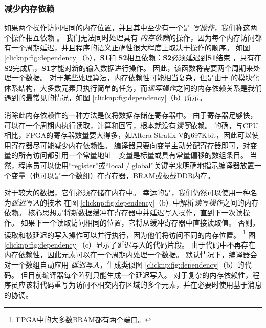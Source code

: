 \subsubsection{减少内存依赖}


如果两个操作访问相同的内存位置，并且其中至少有一个是 \textit {写操作}，我们称这两个操作相互依赖 \cite {dependence}。
我们无法同时处理具有 \textit {内存依赖}的操作，因为每个内存访问都有一个周期延迟，并且程序的语义正确性很大程度上取决于操作的顺序。
如图 \ref {clicknp:fig:dependency}（b），\textbf {S1}和 \textbf {S2}相互依赖：\textbf {S2}必须延迟到\textbf {S1}结束 ，只有在\textbf {S2}完成后，\textbf {S1}才能对新的输入数据进行操作。
因此，该函数将需要两个周期来处理一个数据。
对于某些处理算法，内存依赖性可能相当复杂，但是由于 \name 的模块化体系结构，大多数元素只执行简单的任务，而\textit {读写操作}之间的内存依赖关系是我们遇到的最常见的情况，如图 \ref{clicknp:fig:dependency}（b）所示。

消除此内存依赖性的一种方法是仅将数据存储在寄存器中。
由于寄存器足够快，可以在一个周期内执行读取，计算和回写，根本就没有\textit {读写}依赖。
的确，与CPU相比，FPGA的寄存器数量要大得多，如Altera Stratix V的697Kbit，因此可以使用寄存器尽可能减少内存依赖性。
\name 编译器只要向变量主动分配寄存器即可，对变量的所有访问都引用一个常量地址 - 变量是标量或具有常量偏移的数组条目。
当然，程序员可以使用``register''或``local / global''关键字来明确地指示编译器放置一个变量（也可以是一个数组）在寄存器，BRAM或板载DDR内存。

对于较大的数据，它们必须存储在内存中。
幸运的是，我们仍然可以使用一种名为\textit {延迟写入}的技术
在图 \ref {clicknp:fig:dependency}（b）中解析\textit {读写操作}之间的内存依赖。
核心思想是将新数据缓冲在寄存器中并延迟写入操作，直到下一次读操作。
如果下一个读取访问相同的位置，它将从缓冲寄存器中直接读取值。
否则，读取和被延迟的写入操作可以并行执行，因为他们将访问不同的内存位置。
\footnote{FPGA中的大多数BRAM都有两个端口。}
图 \ref {clicknp:fig:dependency}（c）显示了延迟写入的代码片段。
由于代码中不再存在内存依赖性，因此元素可以在一个周期内处理一个数据。
默认情况下，\name 编译器会对一个数组自动应用 \textit {延迟写入}，生成类似图 \ref {clicknp:fig:dependency}（b）的代码。
但目前编译器每个阵列只能生成一个延迟写入。
对于复杂的内存依赖性，程序员应该将代码重写为访问不相交内存区域的多个元素，并在必要时使用基于消息的协调。


